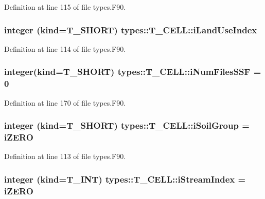 Definition at line 115 of file types.F90.

\hypertarget{typetypes_1_1_t___c_e_l_l_a8f28baa6d460c54a657f2fb1a6050ed3}{
\subsubsection[{iLandUseIndex}]{\setlength{\rightskip}{0pt plus 5cm}integer (kind={\bf T\_\-SHORT}) {\bf types::T\_\-CELL::iLandUseIndex}}}
\label{typetypes_1_1_t___c_e_l_l_a8f28baa6d460c54a657f2fb1a6050ed3}


Definition at line 114 of file types.F90.

\hypertarget{typetypes_1_1_t___c_e_l_l_aa9513e137590e4957c50db0d70947804}{
\subsubsection[{iNumFilesSSF}]{\setlength{\rightskip}{0pt plus 5cm}integer(kind={\bf T\_\-SHORT}) {\bf types::T\_\-CELL::iNumFilesSSF} = 0}}
\label{typetypes_1_1_t___c_e_l_l_aa9513e137590e4957c50db0d70947804}


Definition at line 170 of file types.F90.

\hypertarget{typetypes_1_1_t___c_e_l_l_a4332ab6c0290099b49c1df6a77ca6d89}{
\subsubsection[{iSoilGroup}]{\setlength{\rightskip}{0pt plus 5cm}integer (kind={\bf T\_\-SHORT}) {\bf types::T\_\-CELL::iSoilGroup} = {\bf iZERO}}}
\label{typetypes_1_1_t___c_e_l_l_a4332ab6c0290099b49c1df6a77ca6d89}


Definition at line 113 of file types.F90.

\hypertarget{typetypes_1_1_t___c_e_l_l_a939135f069fa7c1db557789237a3a712}{
\subsubsection[{iStreamIndex}]{\setlength{\rightskip}{0pt plus 5cm}integer (kind={\bf T\_\-INT}) {\bf types::T\_\-CELL::iStreamIndex} = {\bf iZERO}}}
\label{typetypes_1_1_t___c_e_l_l_a939135f069fa7c1db557789237a3a712}


